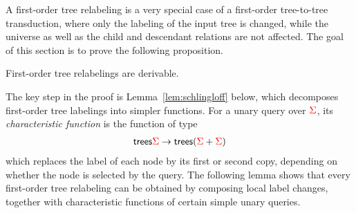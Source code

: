 A first-order tree relabeling is a very special case of a first-order tree-to-tree transduction, where only the labeling of the input tree is changed, while the universe as well as the child and descendant relations are not affected. 
The goal of this section is to prove the following proposition.
\begin{proposition} \label{prop:forat}    
    First-order tree relabelings are derivable.
\end{proposition}   
The key step in the proof is  Lemma~\ref{lem:schlingloff} below, which decomposes  first-order tree labelings into  simpler functions. 
For a unary query  over ${\color{red}{\Sigma}}$,  its \emph{characteristic function} is the function of type
\begin{align*}
 \mathsf {trees} {\color{red}{\Sigma}} \to \mathsf {trees} ({\color{red}{\Sigma}} + {\color{red}{\Sigma}})
\end{align*}
which replaces the label of each node by its first or second copy, depending on whether the node is selected by the query. The following lemma shows that every first-order tree relabeling can be obtained by composing local label changes, together with characteristic functions of certain simple unary queries. 

